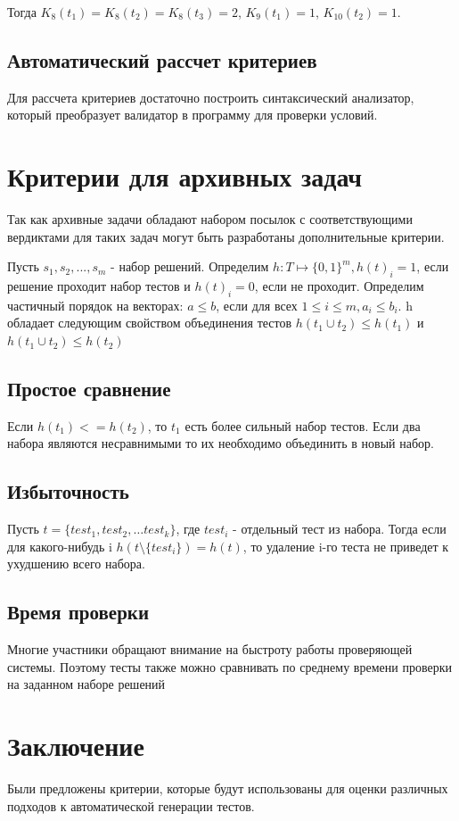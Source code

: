 \documentclass{article}
\begin{document}


    Тогда \(K_8(t_1) = K_8(t_2) = K_8(t_3) = 2\), \(K_9(t_1) = 1\), \(K_{10}(t_2) = 1\).

\subsection{Автоматический рассчет критериев}
    Для рассчета критериев достаточно построить синтаксический анализатор, который преобразует 
    валидатор в программу для проверки условий.
\section{Критерии для архивных задач}
    
    Так как архивные задачи обладают набором посылок с соответствующими вердиктами для таких задач могут быть
    разработаны дополнительные критерии.
    
    Пусть \(s_1, s_2, ..., s_m\) - набор решений. Определим \(h: T \mapsto \{0,1\}^m, h(t)_i = 1\), если 
    решение проходит набор тестов и \(h(t)_i = 0\), если не проходит. Определим частичный порядок на векторах:
    \(a \leq b\), если для всех \(1 \leq i \leq m, a_i \leq b_i\). h обладает следующим свойством объединения
    тестов \(h(t_1 \cup t_2) \leq h(t_1) \) и \(h(t_1 \cup t_2) \leq h(t_2)\)

\subsection{Простое сравнение}
    Если \(h(t_1) <= h(t_2)\), то \(t_1\) есть более сильный набор тестов. Если два набора являются несравнимыми
    то их необходимо объединить в новый набор.
\subsection{Избыточность}
    Пусть \(t = \{test_1,test_2,\ldots test_k\}\), где \(test_i\) - отдельный тест из набора. Тогда если для какого-нибудь
    i \( h(t \setminus  \{test_i\}) = h(t)\), то удаление i-го теста не приведет к ухудшению всего набора.
\subsection{Время проверки}
    Многие участники обращают внимание на быстроту работы проверяющей системы. Поэтому тесты также можно сравнивать
    по среднему времени проверки на заданном наборе решений
\section{Заключение}
    Были предложены критерии, которые будут использованы для оценки различных подходов к автоматической генерации тестов.
\end{document}
